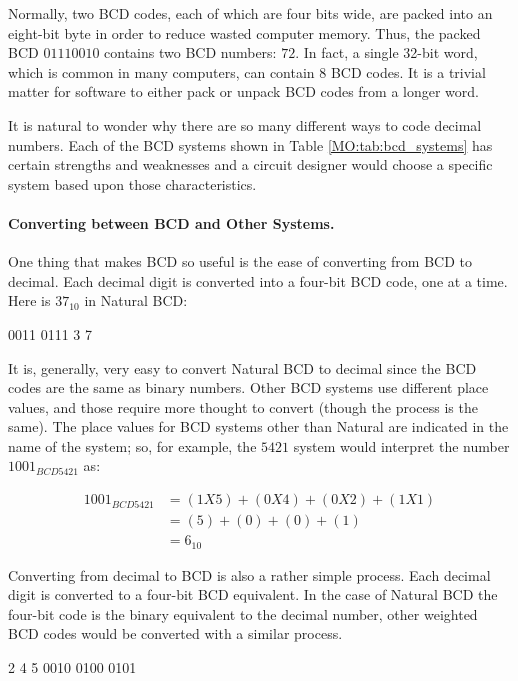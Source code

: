 Normally, two \ac{BCD} codes, each of which are four bits wide, are packed into an eight-bit byte in order to reduce wasted computer memory. Thus, the packed \ac{BCD} $ 0111 0010 $ contains two BCD numbers: $ 72 $. In fact, a single 32-bit word, which is common in many computers, can contain $ 8 $ \ac{BCD} codes. It is a trivial matter for software to either pack or unpack \ac{BCD} codes from a longer word.

It is natural to wonder why there are so many different ways to code decimal numbers. Each of the \ac{BCD} systems shown in Table \ref{MO:tab:bcd_systems} has certain strengths and weaknesses and a circuit designer would choose a specific system based upon those characteristics.

\paragraph{Converting between BCD and Other Systems.} One thing that makes \ac{BCD} so useful is the ease of converting from \ac{BCD} to decimal. Each decimal digit is converted into a four-bit \ac{BCD} code, one at a time. Here is $ 37_{10} $ in Natural \ac{BCD}:

\begin{binDisp}
     0011 0111
       3    7
\end{binDisp}

It is, generally, very easy to convert Natural \ac{BCD} to decimal since the \ac{BCD} codes are the same as binary numbers. Other \ac{BCD} systems use different place values, and those require more thought to convert (though the process is the same). The place values for \ac{BCD} systems other than Natural are indicated in the name of the system; so, for example, the $ 5421 $ system would interpret the number $ 1001_{BCD5421} $ as:

\begin{align}
  1001_{BCD5421} &= (1X5)+(0X4)+(0X2)+(1X1) \\
  \nonumber
  &= (5)+(0)+(0)+(1) \\
  \nonumber
  &= 6_{10}
\end{align}

Converting from decimal to \ac{BCD} is also a rather simple process. Each decimal digit is converted to a four-bit \ac{BCD} equivalent. In the case of Natural \ac{BCD} the four-bit code is the binary equivalent to the decimal number, other weighted \ac{BCD} codes would be converted with a similar process.

\begin{binDisp}
      2    4    5
    0010 0100 0101
\end{binDisp}

